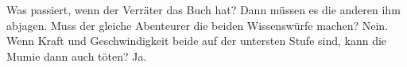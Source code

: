 
\begin{itemize}
    \bitem Was passiert, wenn der Verräter das Buch hat? Dann müssen es die anderen ihm abjagen.
    \bitem Muss der gleiche Abenteurer die beiden Wissenswürfe machen? Nein.
    \bitem Wenn Kraft und Geschwindigkeit beide auf der untersten Stufe sind, kann die Mumie dann auch töten? Ja.
\end{itemize}